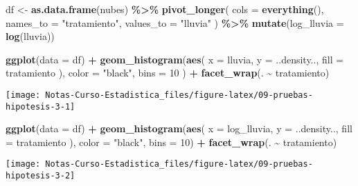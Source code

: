 \documentclass[
  12pt,
]{book}
\newenvironment{Shaded}{\begin{snugshade}}{\end{snugshade}}
\newcommand{\DataTypeTok}[1]{\textcolor[rgb]{0.13,0.29,0.53}{#1}}
\newcommand{\DecValTok}[1]{\textcolor[rgb]{0.00,0.00,0.81}{#1}}
\newcommand{\KeywordTok}[1]{\textcolor[rgb]{0.13,0.29,0.53}{\textbf{#1}}}
\newcommand{\NormalTok}[1]{#1}
\newcommand{\OperatorTok}[1]{\textcolor[rgb]{0.81,0.36,0.00}{\textbf{#1}}}
\newcommand{\StringTok}[1]{\textcolor[rgb]{0.31,0.60,0.02}{#1}}
\begin{document}
\begin{Shaded}
\begin{Highlighting}[]
\NormalTok{df \textless{}{-}}\StringTok{ }\KeywordTok{as.data.frame}\NormalTok{(nubes) }\OperatorTok{\%\textgreater{}\%}
\StringTok{  }\KeywordTok{pivot\_longer}\NormalTok{(}
    \DataTypeTok{cols =} \KeywordTok{everything}\NormalTok{(),}
    \DataTypeTok{names\_to =} \StringTok{"tratamiento"}\NormalTok{, }\DataTypeTok{values\_to =} \StringTok{"lluvia"}
\NormalTok{  ) }\OperatorTok{\%\textgreater{}\%}
\StringTok{  }\KeywordTok{mutate}\NormalTok{(}\DataTypeTok{log\_lluvia =} \KeywordTok{log}\NormalTok{(lluvia))}

\KeywordTok{ggplot}\NormalTok{(}\DataTypeTok{data =}\NormalTok{ df) }\OperatorTok{+}
\StringTok{  }\KeywordTok{geom\_histogram}\NormalTok{(}\KeywordTok{aes}\NormalTok{(}
    \DataTypeTok{x =}\NormalTok{ lluvia,}
    \DataTypeTok{y =}\NormalTok{ ..density..,}
    \DataTypeTok{fill =}\NormalTok{ tratamiento}
\NormalTok{  ),}
  \DataTypeTok{color =} \StringTok{"black"}\NormalTok{, }\DataTypeTok{bins =} \DecValTok{10}
\NormalTok{  ) }\OperatorTok{+}
\StringTok{  }\KeywordTok{facet\_wrap}\NormalTok{(. }\OperatorTok{\textasciitilde{}}\StringTok{ }\NormalTok{tratamiento)}
\end{Highlighting}
\end{Shaded}

\begin{center}\texttt{[image: Notas-Curso-Estadistica\_files/figure-latex/09-pruebas-hipotesis-3-1]} \end{center}

\begin{Shaded}
\begin{Highlighting}[]
\KeywordTok{ggplot}\NormalTok{(}\DataTypeTok{data =}\NormalTok{ df) }\OperatorTok{+}
\StringTok{  }\KeywordTok{geom\_histogram}\NormalTok{(}\KeywordTok{aes}\NormalTok{(}
    \DataTypeTok{x =}\NormalTok{ log\_lluvia,}
    \DataTypeTok{y =}\NormalTok{ ..density..,}
    \DataTypeTok{fill =}\NormalTok{ tratamiento}
\NormalTok{  ), }\DataTypeTok{color =} \StringTok{"black"}\NormalTok{, }\DataTypeTok{bins =} \DecValTok{10}\NormalTok{) }\OperatorTok{+}
\StringTok{  }\KeywordTok{facet\_wrap}\NormalTok{(. }\OperatorTok{\textasciitilde{}}\StringTok{ }\NormalTok{tratamiento)}
\end{Highlighting}
\end{Shaded}

\begin{center}\texttt{[image: Notas-Curso-Estadistica\_files/figure-latex/09-pruebas-hipotesis-3-2]} \end{center}
\end{document}
